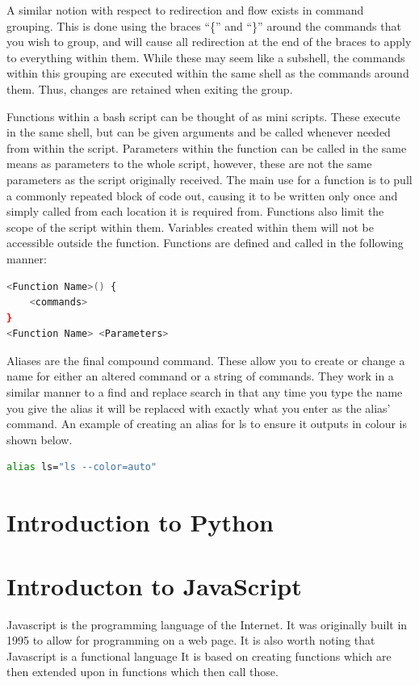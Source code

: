 \documentclass[a4paper,11pt]{report}
\begin{document}
			A similar notion with respect to redirection and flow exists in command grouping. 
			This is done using the braces ``\{'' and ``\}'' around the commands that you wish to group, and will cause all redirection at the end of the braces to apply to everything within them. 
			While these may seem like a subshell, the commands within this grouping are executed within the same shell as the commands around them. 
			Thus, changes are retained when exiting the group. 

			Functions within a bash script can be thought of as mini scripts. 
			These execute in the same shell, but can be given arguments and be called whenever needed from within the script. 
			Parameters within the function can be called in the same means as parameters to the whole script, however, these are not the same parameters as the script originally received. 
			The main use for a function is to pull a commonly repeated block of code out, causing it to be written only once and simply called from each location it is required from. 
			Functions also limit the scope of the script within them. 
			Variables created within them will not be accessible outside the function. 
			Functions are defined and called in the following manner:
			\begin{lstlisting}[language=bash,numbers=none]
<Function Name>() {
	<commands>
}
<Function Name> <Parameters>
			\end{lstlisting}
		
			Aliases are the final compound command. 
			These allow you to create or change a name for either an altered command or a string of commands. 
			They work in a similar manner to a find and replace search in that any time you type the name you give the alias it will be replaced with exactly what you enter as the alias' command. 
			An example of creating an alias for ls to ensure it outputs in colour is shown below. 
			\begin{lstlisting}[language=bash,numbers=none]
alias ls="ls --color=auto"
			\end{lstlisting}
	\section{Introduction to Python}
	\section{Introducton to JavaScript}
		Javascript is the programming language of the Internet. 
		It was originally built in 1995 to allow for programming on a web page. 
		It is also worth noting that Javascript is a functional language\cite{JSProgrammingLanguage}
		It is based on creating functions which are then extended upon in functions which then call those. 
\end{document}
